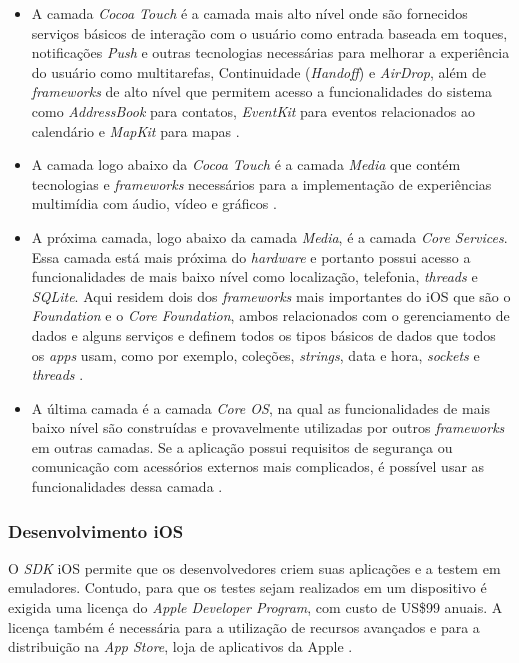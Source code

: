 \begin{itemize}
	\item A camada \textit{Cocoa Touch} é a camada mais alto nível onde são fornecidos serviços básicos de interação 
    com o usuário como entrada baseada em toques, notificações \textit{Push} e outras tecnologias necessárias para
     melhorar a experiência do usuário como multitarefas, Continuidade (\textit{Handoff}) e \textit{AirDrop}, além de \textit{frameworks} 
     de alto nível que permitem acesso a funcionalidades do sistema como \textit{AddressBook} para contatos, \textit{EventKit} 
     para eventos relacionados ao calendário e \textit{MapKit} para mapas \cite{apple_inc_tech_2014}.
	\item A camada logo abaixo da \textit{Cocoa Touch} é a camada \textit{Media} que contém tecnologias e \textit{frameworks} necessários 
    para a implementação de experiências multimídia com áudio, vídeo e gráficos \cite{apple_inc_tech_2014}.
	\item A próxima camada, logo abaixo da camada \textit{Media}, é a camada \textit{Core Services}. Essa camada está mais próxima 
    do \textit{hardware} e portanto possui acesso a funcionalidades de mais baixo nível como localização, telefonia, \textit{threads} 
    e \textit{SQLite}. Aqui residem dois dos \textit{frameworks} mais importantes do iOS que são o \textit{Foundation} e o \textit{Core Foundation}, 
    ambos relacionados com o gerenciamento de dados e alguns serviços e definem todos os tipos básicos de dados que 
    todos os \textit{apps} usam, como por exemplo, coleções, \textit{strings}, data e hora, \textit{sockets} e \textit{threads} \cite{apple_inc_tech_2014}.
	\item A última camada é a camada \textit{Core OS}, na qual as funcionalidades de mais baixo nível são construídas e 
    provavelmente utilizadas por outros \textit{frameworks} em outras camadas. Se a aplicação possui requisitos de segurança 
    ou comunicação com acessórios externos mais complicados, é possível usar as funcionalidades dessa camada \cite{apple_inc_tech_2014}.
\end{itemize}

\subsubsection{Desenvolvimento iOS} \label{subsubsection-dev-ios}

O \textit{SDK} iOS permite que os desenvolvedores criem suas aplicações e a testem em emuladores. 
Contudo, para que os testes sejam realizados em um dispositivo é exigida uma licença do \textit{Apple Developer Program}, 
com custo de US\$99 anuais. A licença também é necessária para a utilização de recursos avançados e para a distribuição 
na \textit{App Store}, loja de aplicativos da Apple \cite{apple_inc_program_2016}.   

